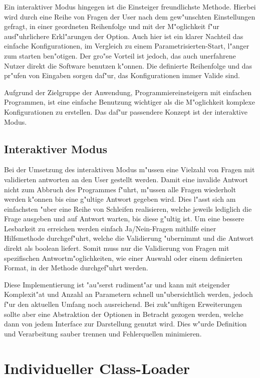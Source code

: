 Ein interaktiver Modus hingegen ist die Einsteiger freundlichste Methode. Hierbei wird durch eine Reihe von Fragen der User nach dem gew"unschten Einstellungen gefragt, in einer geordneten Reihenfolge und mit der M"oglichkeit f"ur ausf"uhrlichere Erkl"arungen der Option. Auch hier ist ein klarer Nachteil das einfache Konfigurationen, im Vergleich zu einem Parametrisierten-Start, l"anger zum starten ben"otigen. Der gro"se Vorteil ist jedoch, das auch unerfahrene Nutzer direkt die Software benutzen k"onnen. Die definierte Reihenfolge und das pr"ufen von Eingaben sorgen daf"ur, das Konfigurationen immer Valide sind.

Aufgrund der Zielgruppe der Anwendung, Programmiereinsteigern mit einfachen Programmen, ist eine einfache Benutzung wichtiger als die M"oglichkeit komplexe Konfigurationen zu erstellen. Das daf"ur passendere Konzept ist der interaktive Modus.

\subsection{Interaktiver Modus}

Bei der Umsetzung des interaktiven Modus m"ussen eine Vielzahl von Fragen mit validierten antworten an den User gestellt werden. Damit eine invalide Antwort nicht zum Abbruch des Programmes f"uhrt, m"ussen alle Fragen wiederholt werden k"onnen bis eine g"ultige Antwort gegeben wird. Dies l"asst sich am einfachsten "uber eine Reihe von Schleifen realisieren, welche jeweils lediglich die Frage ausgeben und auf Antwort warten, bis diese g"ultig ist. Um eine bessere Lesbarkeit zu erreichen werden einfach Ja/Nein-Fragen mithilfe einer Hilfsmethode durchgef"uhrt, welche die Validierung "ubernimmt und die Antwort direkt als boolean liefert. Somit muss nur die Validierung von Fragen mit spezifischen Antwortm"oglichkeiten, wie einer Auswahl oder einem definierten Format, in der Methode durchgef"uhrt werden.

Diese Implementierung ist "au"serst rudiment"ar und kann mit steigender Komplexit"at und Anzahl an Parametern schnell un"ubersichtlich werden, jedoch f"ur den aktuellen Umfang noch ausreichend.
Bei zuk"unftigen Erweiterungen sollte aber eine Abstraktion der Optionen in Betracht gezogen werden, welche dann von jedem Interface zur Darstellung genutzt wird. Dies w"urde Definition und Verarbeitung sauber trennen und Fehlerquellen minimieren.

\section{Individueller Class-Loader}




